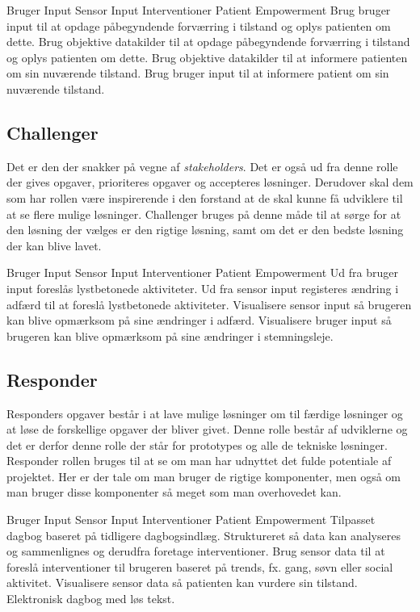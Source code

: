 \coord
  {Bruger Input}
  {Sensor Input}
  {Interventioner}
  {Patient Empowerment}
  {Brug bruger input til at opdage påbegyndende forværring i tilstand og oplys patienten om dette.}
  {Brug objektive datakilder til at opdage påbegyndende forværring i tilstand og oplys patienten om dette.}
  {Brug objektive datakilder til at informere patienten om sin nuværende tilstand.}
  {Brug bruger input til at informere patient om sin nuværende tilstand.}

\subsection{Challenger}
Det er den der snakker på vegne af \textit{stakeholders}.
Det er også ud fra denne rolle der gives opgaver, prioriteres opgaver og accepteres løsninger.
Derudover skal dem som har rollen være inspirerende i den forstand at de skal kunne få udviklere til at se flere mulige løsninger. 
Challenger bruges på denne måde til at sørge for at den løsning der vælges er den rigtige løsning, samt om det er den bedste løsning der kan blive lavet.

\coord
  {Bruger Input}
  {Sensor Input}
  {Interventioner}
  {Patient Empowerment}
  {Ud fra bruger input foreslås lystbetonede aktiviteter.}
  {Ud fra sensor input registeres ændring i adfærd til at foreslå lystbetonede aktiviteter.}
  {Visualisere sensor input så brugeren kan blive opmærksom på sine ændringer i adfærd.}
  {Visualisere bruger input så brugeren kan blive opmærksom på sine ændringer i stemningsleje.}

\subsection{Responder}
Responders opgaver består i at lave mulige løsninger om til færdige løsninger og at løse de forskellige opgaver der bliver givet.
Denne rolle består af udviklerne og det er derfor denne rolle der står for prototypes og alle de tekniske løsninger.
Responder rollen bruges til at se om man har udnyttet det fulde potentiale af projektet.
Her er der tale om man bruger de rigtige komponenter, men også om man bruger disse komponenter så meget som man overhovedet kan. 

\coord
  {Bruger Input}
  {Sensor Input}
  {Interventioner}
  {Patient Empowerment}
  {Tilpasset dagbog baseret på tidligere dagbogsindlæg.
    Struktureret så data kan analyseres og sammenlignes og derudfra foretage interventioner.}
  {Brug sensor data til at foreslå interventioner til brugeren baseret på trends, fx. gang, søvn eller social aktivitet.}
  {Visualisere sensor data så patienten kan vurdere sin tilstand.}
  {Elektronisk dagbog med løs tekst.}

